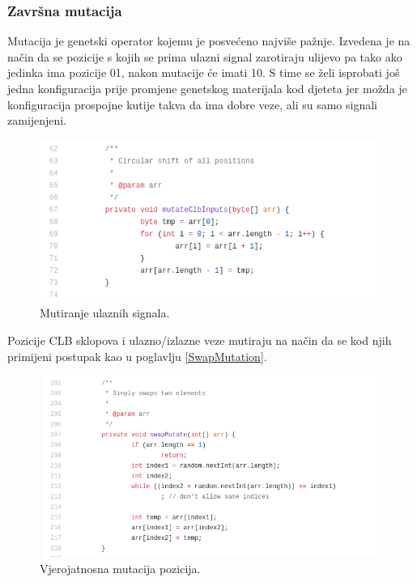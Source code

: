 \documentclass[times, utf8, zavrsni]{fer}
\begin{document}
	\subsubsection{Završna mutacija}
	\label{EndMutation}
	
	Mutacija je genetski operator kojemu je posvećeno najviše pažnje. Izvedena je na način da se pozicije s kojih se prima ulazni signal zarotiraju ulijevo pa tako ako jedinka ima pozicije 01, nakon mutacije će imati 10. S time se želi isprobati još jedna konfiguracija prije promjene genetskog materijala kod djeteta jer možda je konfiguracija prospojne kutije takva da ima dobre veze, ali su samo signali zamijenjeni.  
	
	\begin{figure}[H]
		\centering
		\includegraphics[width=18cm]{slike/circularShift.png}
		\caption{Mutiranje ulaznih signala.}
		\label{fig:sw-boxes-inputs-mutation}
	\end{figure} 
	
	Pozicije CLB sklopova i ulazno/izlazne veze mutiraju na način da se kod njih primijeni postupak kao u poglavlju \ref{SwapMutation}.
	
	\begin{figure}[H]
		\centering
		\includegraphics[width=18cm]{slike/swapMutate.png}
		\caption{Vjerojatnosna mutacija pozicija. }
		\label{fig:sw-boxes-mutation}
	\end{figure} 
	
\end{document}
